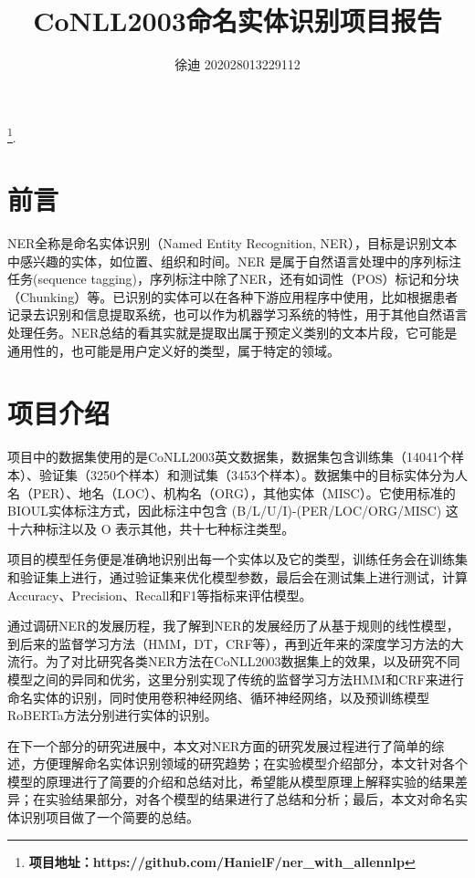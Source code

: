 \documentclass[a4paper, 12pt]{article}
\begin{document}
\title{CoNLL2003命名实体识别项目报告}


\author{徐迪 202028013229112}

\maketitle

\thispagestyle{fancy} %
\footnote{\noindent \textbf{项目地址：https://github.com/HanielF/ner\_with\_allennlp}}.

\section{前言} %
\label{sec:intro}
NER全称是命名实体识别（Named Entity Recognition, NER），目标是识别文本中感兴趣的实体，如位置、组织和时间。NER 是属于自然语言处理中的序列标注任务(sequence tagging)，序列标注中除了NER，还有如词性（POS）标记和分块（Chunking）等。已识别的实体可以在各种下游应用程序中使用，比如根据患者记录去识别和信息提取系统，也可以作为机器学习系统的特性，用于其他自然语言处理任务。NER总结的看其实就是提取出属于预定义类别的文本片段，它可能是通用性的，也可能是用户定义好的类型，属于特定的领域。

\section{项目介绍} %
\label{sec:project}
项目中的数据集使用的是CoNLL2003英文数据集，数据集包含训练集（14041个样本）、验证集（3250个样本）和测试集（3453个样本）。数据集中的目标实体分为人名（PER）、地名（LOC）、机构名（ORG），其他实体（MISC）。它使用标准的BIOUL实体标注方式，因此标注中包含 (B/L/U/I)-(PER/LOC/ORG/MISC) 这十六种标注以及 O 表示其他，共十七种标注类型。

项目的模型任务便是准确地识别出每一个实体以及它的类型，训练任务会在训练集和验证集上进行，通过验证集来优化模型参数，最后会在测试集上进行测试，计算Accuracy、Precision、Recall和F1等指标来评估模型。

通过调研NER的发展历程，我了解到NER的发展经历了从基于规则的线性模型，到后来的监督学习方法（HMM，DT，CRF等），再到近年来的深度学习方法的大流行。为了对比研究各类NER方法在CoNLL2003数据集上的效果，以及研究不同模型之间的异同和优劣，这里分别实现了传统的监督学习方法HMM和CRF来进行命名实体的识别，同时使用卷积神经网络、循环神经网络，以及预训练模型RoBERTa方法分别进行实体的识别。

在下一个部分的研究进展中，本文对NER方面的研究发展过程进行了简单的综述，方便理解命名实体识别领域的研究趋势；在实验模型介绍部分，本文针对各个模型的原理进行了简要的介绍和总结对比，希望能从模型原理上解释实验的结果差异；在实验结果部分，对各个模型的结果进行了总结和分析；最后，本文对命名实体识别项目做了一个简要的总结。
\end{document}
